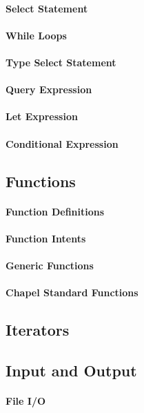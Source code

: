 \paragraph{Select Statement}
\paragraph{While Loops}
\paragraph{Type Select Statement}
\paragraph{Query Expression}
\paragraph{Let Expression}
\paragraph{Conditional Expression}

\subsection{Functions}
\paragraph{Function Definitions}
\paragraph{Function Intents}
\paragraph{Generic Functions}
\paragraph{Chapel Standard Functions}

\subsection{Iterators}

\subsection{Input and Output}
\paragraph{File I/O}
